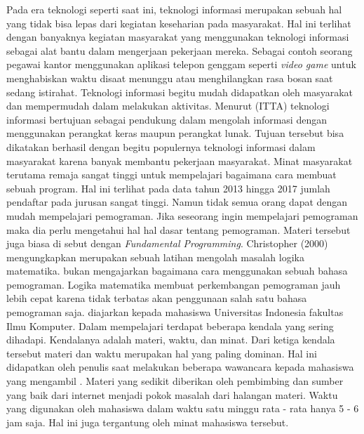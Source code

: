 Pada era teknologi seperti saat ini, teknologi informasi merupakan sebuah hal yang tidak bisa lepas dari kegiatan keseharian pada masyarakat. Hal ini terlihat dengan banyaknya kegiatan masyarakat yang menggunakan teknologi informasi sebagai alat bantu dalam mengerjaan pekerjaan mereka. Sebagai contoh seorang pegawai kantor menggunakan aplikasi telepon genggam seperti \textit{video game} untuk menghabiskan waktu disaat menunggu atau menghilangkan rasa bosan saat sedang istirahat.
\linebreak
\linebreak
Teknologi informasi begitu mudah didapatkan oleh masyarakat dan mempermudah dalam melakukan aktivitas. Menurut \ITTA (ITTA) teknologi informasi bertujuan sebagai pendukung dalam mengolah informasi dengan menggunakan perangkat keras maupun perangkat lunak. Tujuan tersebut bisa dikatakan berhasil dengan begitu populernya teknologi informasi dalam masyarakat karena banyak membantu pekerjaan masyarakat.
\linebreak\linebreak
Minat masyarakat terutama remaja sangat tinggi untuk mempelajari bagaimana cara membuat sebuah program. Hal ini terlihat pada data tahun 2013 hingga 2017 jumlah pendaftar pada jurusan  \program sangat tinggi. Namun tidak semua orang dapat dengan mudah mempelajari pemograman. Jika seseorang ingin mempelajari pemograman maka dia perlu mengetahui hal hal dasar tentang pemograman. Materi tersebut juga biasa di sebut dengan \textit{Fundamental Programming}.
\linebreak\linebreak
Christopher (2000) mengungkapkan \ddp merupakan sebuah latihan mengolah masalah logika matematika. \DDP bukan mengajarkan bagaimana cara menggunakan sebuah bahasa pemograman. Logika matematika membuat perkembangan pemograman jauh lebih cepat karena tidak terbatas akan penggunaan salah satu bahasa pemograman saja.
\linebreak\linebreak
\DDP diajarkan kepada mahasiswa Universitas Indonesia fakultas Ilmu Komputer. Dalam mempelajari \ddp terdapat beberapa kendala yang sering dihadapi. Kendalanya adalah materi, waktu, dan minat. Dari ketiga kendala tersebut materi dan waktu merupakan hal yang paling dominan. Hal ini didapatkan oleh penulis saat melakukan beberapa wawancara kepada mahasiswa yang mengambil \ddp. Materi yang sedikit diberikan oleh pembimbing dan sumber yang baik dari internet menjadi pokok masalah dari halangan materi. Waktu yang digunakan oleh mahasiswa dalam waktu satu minggu rata - rata hanya 5 - 6 jam saja. Hal ini juga tergantung oleh minat mahasiswa tersebut.
